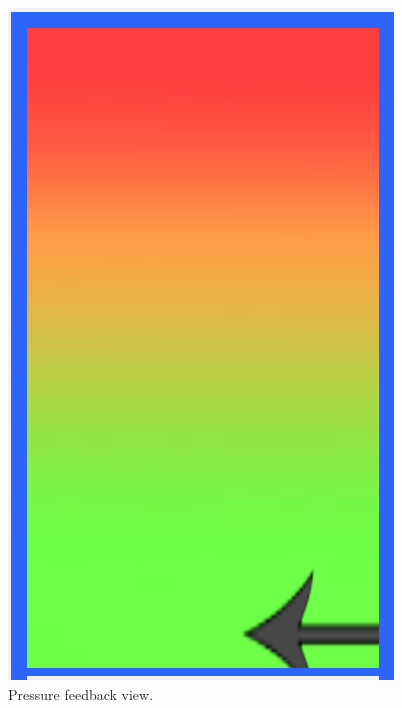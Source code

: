 \begin{figure}[H]
\begin{minipage}[c]{.3\textwidth}
	\includegraphics[width=\textwidth]{Figures/pressure.png}
	\caption{Pressure feedback view.}
	\label{feedback-pressure}
	\end{minipage}
\end{figure}
%
